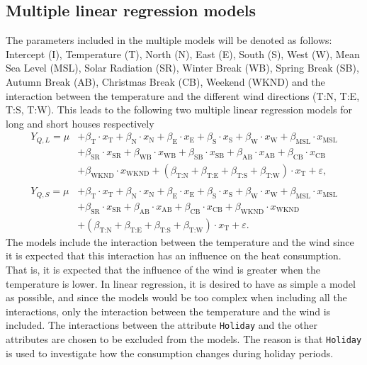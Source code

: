 \subsection{Multiple linear regression models}
The parameters included in the multiple models will be denoted as follows: Intercept (I), Temperature (T), North (N), East (E), South (S), West (W), Mean Sea Level (MSL), Solar Radiation (SR), Winter Break (WB), Spring Break (SB), Autumn Break (AB), Christmas Break (CB), Weekend (WKND) and the interaction between the temperature and the different wind directions (T:N, T:E, T:S, T:W). This leads to the following two multiple linear regression models for long and short houses respectively
\begin{align}
    Y_{Q,L} = \mu & + \beta_{\text{T}}\cdot x_{\text{T}} + \beta_{\text{N}}\cdot x_{\text{N}} + \beta_{\text{E}}\cdot x_{\text{E}}+ \beta_{\text{S}}\cdot x_{\text{S}} + \beta_{\text{W}}\cdot x_{\text{W}} + \beta_{\text{MSL}}\cdot x_{\text{MSL}} \nonumber \\ & + \beta_{\text{SR}}\cdot x_{\text{SR}} + \beta_{\text{WB}}\cdot x_{\text{WB}} + \beta_{\text{SB}}\cdot x_{\text{SB}}  + \beta_{\text{AB}}\cdot x_{\text{AB}} + \beta_{\text{CB}}\cdot x_{\text{CB}} \label{eq: multi_L}  \\ & + \beta_{\text{WKND}}\cdot x_{\text{WKND}} + (\beta_{\text{T:N}} + \beta_{\text{T:E}} + \beta_{\text{T:S}} + \beta_{\text{T:W}}) \cdot x_{\text{T}} + \varepsilon, \nonumber \\ \nonumber \\
    Y_{Q,S} = \mu & + \beta_{\text{T}}\cdot x_{\text{T}} + \beta_{\text{N}}\cdot x_{\text{N}} + \beta_{\text{E}}\cdot x_{\text{E}}+ \beta_{\text{S}}\cdot x_{\text{S}} + \beta_{\text{W}}\cdot x_{\text{W}} + \beta_{\text{MSL}}\cdot x_{\text{MSL}} \nonumber \\ & + \beta_{\text{SR}}\cdot x_{\text{SR}} + \beta_{\text{AB}}\cdot x_{\text{AB}} + \beta_{\text{CB}}\cdot x_{\text{CB}} + \beta_{\text{WKND}}\cdot x_{\text{WKND}} \label{eq: multi_S} \\ & + (\beta_{\text{T:N}} + \beta_{\text{T:E}} + \beta_{\text{T:S}} + \beta_{\text{T:W}}) \cdot x_{\text{T}} + \varepsilon.  \nonumber
\end{align}
The models include the interaction between the temperature and the wind since it is expected that this interaction has an influence on the heat consumption. That is, it is expected that the influence of the wind is greater when the temperature is lower. In linear regression, it is desired to have as simple a model as possible, and since the models would be too complex when including all the interactions, only the interaction between the temperature and the wind is included.
\noindent The interactions between the attribute \texttt{Holiday} and the other attributes are chosen to be excluded from the models. The reason is that \texttt{Holiday} is used to investigate how the consumption changes during holiday periods. 

